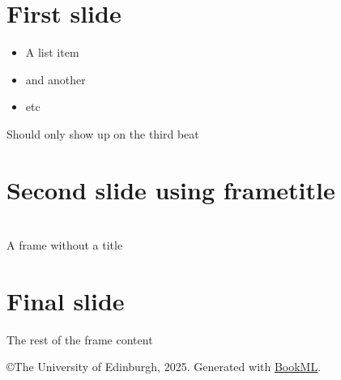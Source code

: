 \documentclass{article}
\renewenvironment{frame}[1]{\section{#1}}{}
\newcommand{\visible}{}
\begin{document}
\iflatexml\else
    \frame{\titlepage}
\fi

\begin{frame}{First slide}
    \begin{itemize}
        \item A list item
        \item and another
        \item etc
    \end{itemize}
    \visible{Should only show up on the third beat}
\end{frame}

\begin{frame}{Second slide using frametitle}
\end{frame}

\begin{frame}{}
    A frame without a title
\end{frame}

\begin{frame}{Final slide}
    The rest of the frame content
\end{frame}







\iflatexml
    \copyright The University of Edinburgh, 2025. Generated with \href{https://vlmantova.github.io/bookml/}{BookML}.
\fi
\end{document}
